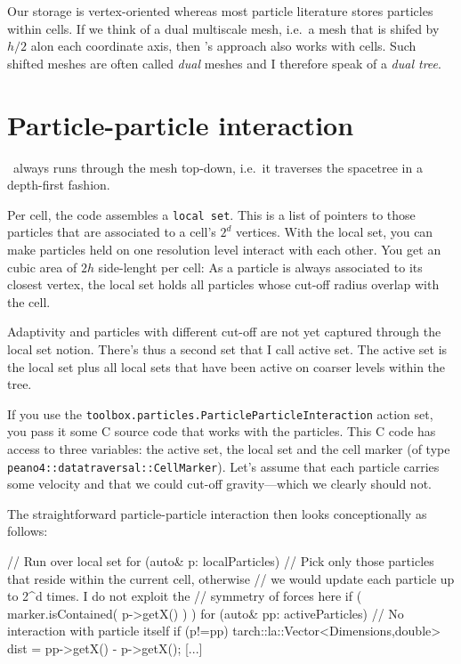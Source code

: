 \begin{definition}
  Our storage is vertex-oriented whereas most particle literature stores
  particles within cells.
  If we think of a dual multiscale mesh, i.e.~a mesh that is shifed by $h/2$
  alon each coordinate axis, then \Peano's approach also works with cells.
  Such shifted meshes are often called \emph{dual} meshes and I therefore speak
  of a \emph{dual tree}.
\end{definition}



\section{Particle-particle interaction}


\Peano\ always runs through the mesh top-down, i.e.~it traverses the spacetree
in a depth-first fashion.


Per cell, the code assembles a \texttt{local set}. 
This is a list of pointers to those particles that are associated to a cell's
$2^d$ vertices.
With the local set, you can make particles held on one resolution level
interact with each other.
You get an cubic area of $2h$ side-lenght per cell:
As a particle is always associated to its closest vertex, the local set holds all particles whose cut-off radius overlap with the cell. 


Adaptivity and particles with different cut-off are not yet captured through the
local set notion.
There's thus a second set that I call active set. 
The active set is the local set plus all local sets that have been active on
coarser levels within the tree.


If you use the \texttt{toolbox.particles.ParticleParticleInteraction} action
set, you pass it some C source code that works with the particles.
This C code has access to three variables: the active set, the local set and the
cell marker (of type \linebreak \texttt{peano4::datatraversal::CellMarker}).
Let's assume that each particle carries some velocity and that we could cut-off
gravity---which we clearly should not.


The straightforward particle-particle interaction then looks conceptionally as
follows:

\begin{code}
// Run over local set
for (auto& p: localParticles) {
  // Pick only those particles that reside within the current cell, otherwise
  // we would update each particle up to 2^d times. I do not exploit the
  // symmetry of forces here
  if ( marker.isContained( p->getX() ) ) {
    for (auto& pp: activeParticles) {
      // No interaction with particle itself
      if (p!=pp) {
        tarch::la::Vector<Dimensions,double> dist = pp->getX() - p->getX();
        [...]
      }
    }
  }
}
\end{code}




